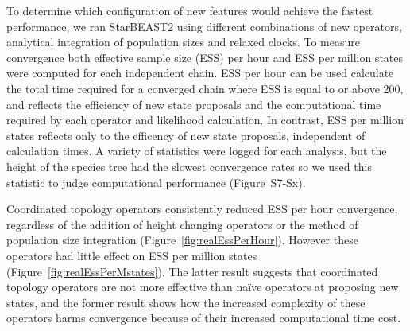 \documentclass[12pt]{article}
\begin{document}
To determine which configuration of new features would achieve the fastest
performance, we ran StarBEAST2 using different combinations of new operators,
analytical integration of population sizes and relaxed clocks. To measure
convergence both effective sample size (ESS) per hour and ESS per million states
were computed for each independent chain. ESS per hour can be used calculate the
total time required for a converged chain where ESS is equal to or above 200,
and reflects the efficiency of new state proposals and the computational time
required by each operator and likelihood calculation. In contrast, ESS per
million states reflects only to the efficency of new state proposals,
independent of calculation times. A variety of statistics were logged for each
analysis, but the height of the species tree had the slowest convergence rates
so we used this statistic to judge computational performance (Figure~S7-Sx).

Coordinated topology operators consistently reduced ESS per hour convergence,
regardless of the addition of height changing operators or the method of
population size integration (Figure~\ref{fig:realEssPerHour}). However these
operators had little effect on ESS per million states (Figure~\ref{fig:realEssPerMstates}).
The latter result suggests that coordinated topology operators are not more
effective than na\"ive operators at proposing new states, and the former result
shows how the increased complexity of these operators harms convergence because
of their increased computational time cost.
\end{document}

